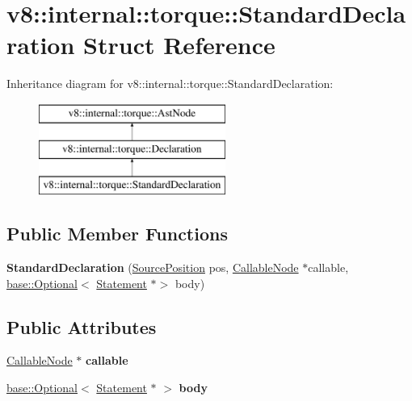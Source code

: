 \hypertarget{structv8_1_1internal_1_1torque_1_1StandardDeclaration}{}\section{v8\+:\+:internal\+:\+:torque\+:\+:Standard\+Declaration Struct Reference}
\label{structv8_1_1internal_1_1torque_1_1StandardDeclaration}
Inheritance diagram for v8\+:\+:internal\+:\+:torque\+:\+:Standard\+Declaration\+:\begin{figure}[H]
\begin{center}
\leavevmode
\includegraphics[height=3.000000cm]{structv8_1_1internal_1_1torque_1_1StandardDeclaration}
\end{center}
\end{figure}
\subsection*{Public Member Functions}
\begin{DoxyCompactItemize}
\item 
\mbox{\label{structv8_1_1internal_1_1torque_1_1StandardDeclaration_a35e484d673a526da8c1cfdc5b8af97f0}} 
{\bfseries Standard\+Declaration} (\mbox{\hyperlink{structv8_1_1internal_1_1torque_1_1SourcePosition}{Source\+Position}} pos, \mbox{\hyperlink{structv8_1_1internal_1_1torque_1_1CallableNode}{Callable\+Node}} $\ast$callable, \mbox{\hyperlink{classv8_1_1base_1_1Optional}{base\+::\+Optional}}$<$ \mbox{\hyperlink{structv8_1_1internal_1_1torque_1_1Statement}{Statement}} $\ast$$>$ body)
\end{DoxyCompactItemize}
\subsection*{Public Attributes}
\begin{DoxyCompactItemize}
\item 
\mbox{\label{structv8_1_1internal_1_1torque_1_1StandardDeclaration_a8e24d0f0b55bc4ba915f5efbdcdc4e67}} 
\mbox{\hyperlink{structv8_1_1internal_1_1torque_1_1CallableNode}{Callable\+Node}} $\ast$ {\bfseries callable}
\item 
\mbox{\label{structv8_1_1internal_1_1torque_1_1StandardDeclaration_aec0321c7b3a8ab7bda88bbc95edafdf5}} 
\mbox{\hyperlink{classv8_1_1base_1_1Optional}{base\+::\+Optional}}$<$ \mbox{\hyperlink{structv8_1_1internal_1_1torque_1_1Statement}{Statement}} $\ast$ $>$ {\bfseries body}
\end{DoxyCompactItemize}
